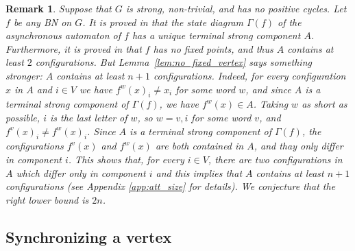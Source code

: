 \documentclass[11pt,letter]{article}
\newtheorem{remark}{Remark}
\begin{document}
\begin{remark}\label{rem:att_size}
Suppose that $G$ is strong, non-trivial, and has no positive cycles. Let $f$ be any BN on $G$. It is proved in \cite{RC07} that the state diagram $\Gamma(f)$ of the asynchronous automaton of $f$ has a unique terminal strong component $A$. Furthermore, it is proved in \cite{A08} that $f$ has no fixed points, and thus $A$ contains at least $2$ configurations. But Lemma~\ref{lem:no_fixed_vertex} says something stronger: $A$ contains at least $n+1$ configurations. Indeed, for every configuration $x$ in $A$ and $i\in V$ we have $f^w(x)_i\neq x_i$ for some word $w$, and since $A$ is a terminal strong component of $\Gamma(f)$, we have $f^w(x)\in A$. Taking $w$ as short as possible, $i$ is the last letter of $w$, so $w=v,i$ for some word $v$, and $f^v(x)_i\neq f^w(x)_i$. Since $A$ is a terminal strong component of $\Gamma(f)$, the configurations $f^v(x)$ and $f^w(x)$ are both contained in $A$, and thay only differ in component $i$. This shows that, for every $i\in V$, there are two configurations in $A$ which differ only in component $i$ and this implies that $A$ contains at least $n+1$ configurations (see Appendix \ref{app:att_size} for details). We conjecture that the right lower bound is $2n$.
\end{remark}

\subsection{Synchronizing a vertex}
\end{document}

